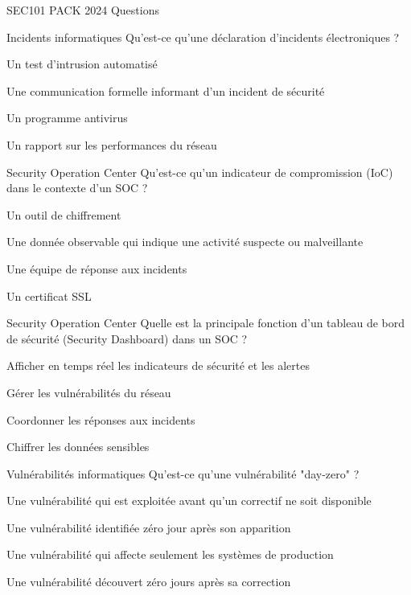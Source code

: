 \documentclass[12pt]{article}
\begin{document}
\begin{quiz}{SEC101 PACK 2024 Questions}
\begin{multi}[points=1]{Incidents informatiques}
Qu'est-ce qu'une déclaration d'incidents électroniques ?
    \item Un test d'intrusion automatisé
    \item *Une communication formelle informant d'un incident de sécurité
    \item Un programme antivirus
    \item Un rapport sur les performances du réseau
\end{multi}

\begin{multi}[points=1]{Security Operation Center}
Qu'est-ce qu'un indicateur de compromission (IoC) dans le contexte d'un SOC ?
    \item Un outil de chiffrement
    \item *Une donnée observable qui indique une activité suspecte ou malveillante
    \item Une équipe de réponse aux incidents
    \item Un certificat SSL
\end{multi}

\begin{multi}[points=1]{Security Operation Center}
Quelle est la principale fonction d'un tableau de bord de sécurité (Security Dashboard) dans un SOC ?
    \item *Afficher en temps réel les indicateurs de sécurité et les alertes
    \item Gérer les vulnérabilités du réseau
    \item Coordonner les réponses aux incidents
    \item Chiffrer les données sensibles
\end{multi}

\begin{multi}[points=1]{Vulnérabilités informatiques}
Qu'est-ce qu'une vulnérabilité "day-zero" ?
    \item *Une vulnérabilité qui est exploitée avant qu'un correctif ne soit disponible
    \item Une vulnérabilité identifiée zéro jour après son apparition
    \item Une vulnérabilité qui affecte seulement les systèmes de production
    \item Une vulnérabilité découvert zéro jours après sa correction
\end{multi}


\end{quiz}
\end{document}

